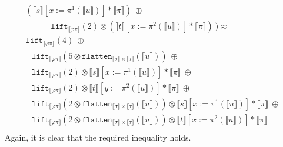 \documentclass[a4paper,UKenglish,cleveref,autoref,numberwithinsect]{lipics-v2019}
\theoremstyle{definition}
\newcommand{\flatten}{\mathtt{flatten}}
\newcommand{\lift}{\mathtt{lift}}
\newcommand{\typeinterpret}[1]{\llbracket #1 \rrbracket}
\newcommand{\interpret}[1]{\llbracket #1 \rrbracket}
\begin{document}
\begin{itemize}
\[\begin{array}{l}
    (\typeinterpret{s}[x:=\pi^1(\interpret{u})]
      * \typeinterpret{\pi})\ \oplus \\
  \phantom{ABCD}
    \lift_{\typeinterpret{\varphi\pi}}(2) \otimes
    (\typeinterpret{t}[x:=\pi^2(\interpret{u})]
      * \typeinterpret{\pi})
  \ ) \approx \\
  \lift_{\typeinterpret{\varphi\pi}}(4)\ \oplus \\
  \phantom{A}
  \lift_{\typeinterpret{\varphi\pi}}(5 \otimes \flatten_{
    \typeinterpret{\sigma} \times \typeinterpret{\tau}}(
    \interpret{u}))\ \oplus \\
  \phantom{A}
  \lift_{\typeinterpret{\varphi\pi}}(2) \otimes
    \interpret{s}[x:=\pi^1(\interpret{u})] * \typeinterpret{\pi}\ \oplus\\
  \phantom{A}
  \lift_{\typeinterpret{\varphi\pi}}(2) \otimes
    \interpret{t}[y:=\pi^2(\interpret{u})] * \typeinterpret{\pi}\ \oplus\\
  \phantom{A}
  \lift_{\typeinterpret{\varphi\pi}}(2 \otimes
    \flatten_{\typeinterpret{\sigma} \times \typeinterpret{\tau}}(
      \interpret{u})) \otimes \interpret{s}[x:=\pi^1(\interpret{u})]
      * \typeinterpret{\pi}\ \oplus \\
  \phantom{A}
  \lift_{\typeinterpret{\varphi\pi}}(2 \otimes
    \flatten_{\typeinterpret{\sigma} \times \typeinterpret{\tau}}(
      \interpret{u})) \otimes \interpret{t}[x:=\pi^2(\interpret{u})]
      * \typeinterpret{\pi} \\
  \end{array}
  \]
  Again, it is clear that the required inequality holds.


\end{itemize}
\end{document}
